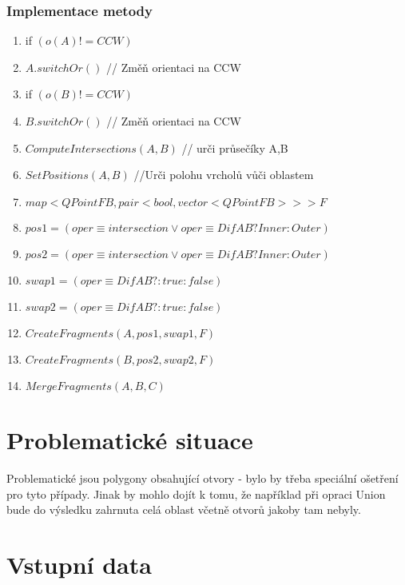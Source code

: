 \documentclass[a4paper, 12pt]{article}
\begin{document}
\subsubsection{Implementace metody}
\begin{enumerate}
	\item if $ (o(A) != CCW) $
	\item \hspace{1cm} $ A.switchOr() $ // Změň orientaci na CCW
	\item if $ (o(B) != CCW) $
	\item \hspace{1cm} $ B.switchOr() $ // Změň orientaci na CCW
	\item $ ComputeIntersections(A,B) $ // urči průsečíky A,B
	\item $ SetPositions (A,B) $ //Urči polohu vrcholů vůči oblastem
	\item $map <QPointFB, pair <bool, vector<QPointFB>>> F$
	\item $ pos1 = (oper \equiv intersection \vee oper \equiv DifAB?Inner:Outer) $
	\item $ pos2 = (oper \equiv intersection \vee oper \equiv DifAB?Inner:Outer) $
	\item $ swap1 = (oper \equiv DifAB? : true : false) $
	\item $ swap2 = (oper \equiv DifAB? : true : false) $
	\item $ CreateFragments (A, pos1, swap1, F) $
	\item $ CreateFragments (B, pos2, swap2, F) $
	\item $ MergeFragments (A,B,C) $
\end{enumerate}

\clearpage

\section{Problematické situace}

Problematické jsou polygony obsahující otvory - bylo by třeba speciální ošetření pro tyto případy. Jinak by mohlo dojít k tomu, že například při opraci Union bude do výsledku zahrnuta celá oblast včetně otvorů jakoby tam nebyly.
\clearpage

\section{Vstupní data}
\end{document}
